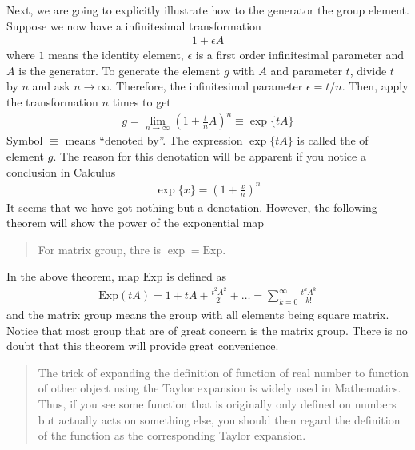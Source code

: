 \documentclass[letterpaper,10pt,english]{sphinxmanual}
\begin{document}
Next, we are going to explicitly illustrate how to the generator  the group element. Suppose we now have a infinitesimal transformation
\begin{equation*}
\begin{split}1+\epsilon A\end{split}
\end{equation*}
where \(1\) means the identity element, \(\epsilon\) is a first order infinitesimal parameter and \(A\) is the generator. To generate the element \(g\) with  \(A\) and parameter \(t\), divide \(t\) by \(n\) and ask \(n\rightarrow\infty\). Therefore, the infinitesimal parameter \(\epsilon=t/n\). Then, apply the transformation \(n\) times to get
\begin{equation*}
\begin{split}g = \lim_{n\rightarrow\infty}(1+\frac{t}{n}A)^n\equiv\exp\{tA\}\end{split}
\end{equation*}
Symbol \(\equiv\) means ``denoted by''. The expression \(\exp\{tA\}\) is called the  of element \(g\). The reason for this denotation will be apparent if you notice a conclusion in Calculus
\begin{equation*}
\begin{split}\exp\{x\} = (1 + \frac{x}{n})^n\end{split}
\end{equation*}
It seems that we have got nothing but a denotation. However, the following theorem will show the power of the exponential map
\begin{quote}

 For matrix group, thre is \(\exp = \mathrm{Exp}\).
\end{quote}

In the above theorem, map \(\mathrm{Exp}\) is defined as
\begin{equation*}
\begin{split}\mathrm{Exp}(tA) = 1 + tA + \frac{t^2A^2}{2!} + \ldots = \sum_{k=0}^{\infty}\frac{t^kA^k}{k!}\end{split}
\end{equation*}
and the matrix group means the group with all elements being square matrix. Notice that most group that are of great concern is the matrix group. There is no doubt that this theorem will provide great convenience.
\begin{quote}

The trick of expanding the definition of function of real number to function of other object using the Taylor expansion is widely used in Mathematics. Thus, if you see some function that is originally only defined on numbers but actually acts on something else, you should then regard the definition of the function as the corresponding Taylor expansion.
\end{quote}
\end{document}
